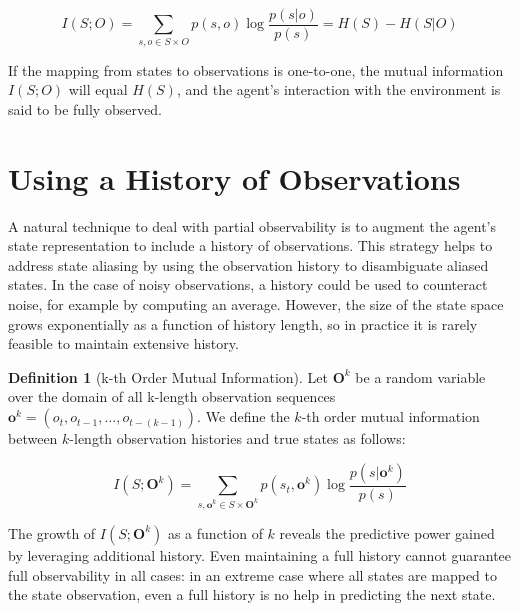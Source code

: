 \documentclass{article} %
\theoremstyle{definition}
\newtheorem{definition}{Definition}[section]
\begin{document}
\[
I(S;O) = \sum_{s,o \in S \times O} p(s,o) \log \frac{p(s|o)}{p(s)} = H(S) - H(S|O)
\]

If the mapping from states to observations is one-to-one, the mutual
information $I(S;O)$ will equal $H(S)$, and the agent's interaction
with the environment is said to be fully observed.

\section{Using a History of Observations}
A natural technique to deal with partial observability is to augment
the agent's state representation to include a history of
observations. This strategy helps to address state aliasing by using
the observation history to disambiguate aliased states. In the case of
noisy observations, a history could be used to counteract noise, for
example by computing an average. However, the size of the state space
grows exponentially as a function of history length, so in practice it
is rarely feasible to maintain extensive history.

\begin{definition}[k-th Order Mutual Information]
Let $\textbf{O}^k$ be a random variable over the domain of all
k-length observation sequences $\textbf{o}^k = (o_t, o_{t-1}, \dots,
o_{t-(k-1)})$. We define the $k$-th order mutual information between
$k$-length observation histories and true states as follows:

\[
I(S;\textbf{O}^k) = \sum_{s,\textbf{o}^k \in S \times \textbf{O}^k} p(s_t,\textbf{o}^k) \log \frac{p(s|\textbf{o}^k)}{p(s)}
\]
\end{definition}

The growth of $I(S;\textbf{O}^k)$ as a function of $k$ reveals the
predictive power gained by leveraging additional history. Even
maintaining a full history cannot guarantee full observability in all
cases: in an extreme case where all states are mapped to the state
observation, even a full history is no help in predicting the next
state.

\end{document}
